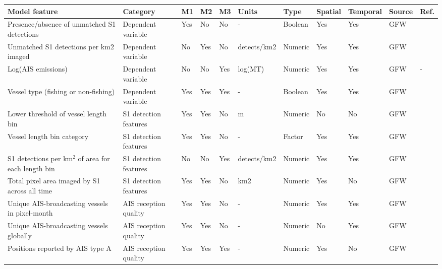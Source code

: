 \documentclass[lineno,pdflatex,sn-nature]{sn-jnl}
\providecommand{\DIFaddbeginFL}{} %
\providecommand{\DIFdelendFL}{} %
\providecommand{\DIFaddincludegraphics}[2][]{{\color{blue}\fbox{\DIFOincludegraphics[#1]{#2}}}} %
\DeclareRobustCommand{\DIFaddbeginFL}{\DIFOaddbeginFL \let\includegraphics\DIFaddincludegraphics} %
\DeclareRobustCommand{\DIFdelendFL}{\DIFOaddendFL \let\includegraphics\DIFOincludegraphics} %
\begin{document}
\begin{table}[!h]
\DIFdelendFL \DIFaddbeginFL \setlength{\tabcolsep}{2pt}
\begin{tabular}[t]{lllllllllll}
\toprule
Model feature & Category & M1 & M2 & M3 & Units & Type & Spatial & Temporal & Source & Ref.\\
\midrule
Presence/absence of unmatched S1 detections & Dependent variable & Yes & No & No & - & Boolean & Yes & Yes & GFW & \cite{paolo2024satellite}\\
Unmatched S1 detections per km2 imaged & Dependent variable & No & Yes & No & detects/km2 & Numeric & Yes & Yes & GFW & \cite{paolo2024satellite}\\
Log(AIS emissions) & Dependent variable & No & No & Yes & log(MT) & Numeric & Yes & Yes & GFW & -\\
Vessel type (fishing or non-fishing) & Dependent variable & Yes & Yes & Yes & - & Boolean & Yes & Yes & GFW & \cite{paolo2024satellite}\\
Lower threshold of vessel length bin & S1 detection features & Yes & Yes & No & m & Numeric & No & No & GFW & \cite{paolo2024satellite}\\
\addlinespace
Vessel length bin category & S1 detection features & Yes & Yes & No & - & Factor & Yes & Yes & GFW & \cite{paolo2024satellite}\\
S1 detections per km$^2$ of area for each length bin & S1 detection features & No & No & Yes & detects/km2 & Numeric & Yes & Yes & GFW & \cite{paolo2024satellite}\\
Total pixel area imaged by S1 across all time & S1 detection features & Yes & Yes & No & km2 & Numeric & Yes & No & GFW & \cite{paolo2024satellite}\\
Unique AIS-broadcasting vessels in pixel-month & AIS reception quality & Yes & Yes & No & - & Numeric & Yes & Yes & GFW & \cite{kroodsma2018tracking}\\
Unique AIS-broadcasting vessels globally & AIS reception quality & Yes & Yes & No & - & Numeric & No & Yes & GFW & \cite{kroodsma2018tracking}\\
\addlinespace
Positions reported by AIS type A & AIS reception quality & Yes & Yes & Yes & - & Numeric & Yes & No & GFW & \cite{kroodsma2018tracking}\\

\end{tabular}
\end{table}
\end{document}
